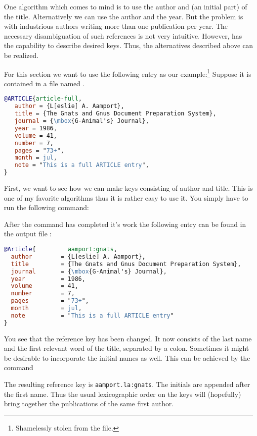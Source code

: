 \documentclass[11pt,a4paper]{scrbook}
\begin{document}
One algorithm which comes to mind is to use the author and (an initial part)
of the title. Alternatively we can use the author and the year. But the
problem is with industrious authors writing more than one publication per
year. The necessary disambiguation of such references is not very intuitive.
However, \BibTool{} has the capability to describe desired keys. Thus, the
alternatives described above can be realized.


For this section we want to use the following \BibTeX{} entry as our
example:\footnote{Shamelessly stolen from the \BibTeX{} 
  file.} Suppose it is contained in a file named .

\label{sample1}%
\begin{lstlisting}[language=BibTeX]
@ARTICLE{article-full,
   author = {L[eslie] A. Aamport},
   title = {The Gnats and Gnus Document Preparation System},
   journal = {\mbox{G-Animal's} Journal},
   year = 1986,
   volume = 41,
   number = 7,
   pages = "73+",
   month = jul,
   note = "This is a full ARTICLE entry",
}
\end{lstlisting}

First, we want to see how we can make keys consisting of author and title.
This is one of my favorite algorithms thus it is rather easy to use it. You
simply have to run the following command:


After the command has completed it's work the following entry can be found in
the output file : 

\begin{lstlisting}[language=BibTeX]
@Article{         aamport:gnats,
  author        = {L[eslie] A. Aamport},
  title         = {The Gnats and Gnus Document Preparation System},
  journal       = {\mbox{G-Animal's} Journal},
  year          = 1986,
  volume        = 41,
  number        = 7,
  pages         = "73+",
  month         = jul,
  note          = "This is a full ARTICLE entry"
}
\end{lstlisting}

You see that the reference key has been changed. It now consists of the last
name and the first relevant word of the title, separated by a colon. Sometimes
it might be desirable to incorporate the initial names as well. This can be
achieved by the command


The resulting reference key is \texttt{aamport.la:gnats}. The initials are
appended after the first name. Thus the usual lexicographic order on the keys
will (hopefully) bring together the publications of the same first author.
\end{document}
